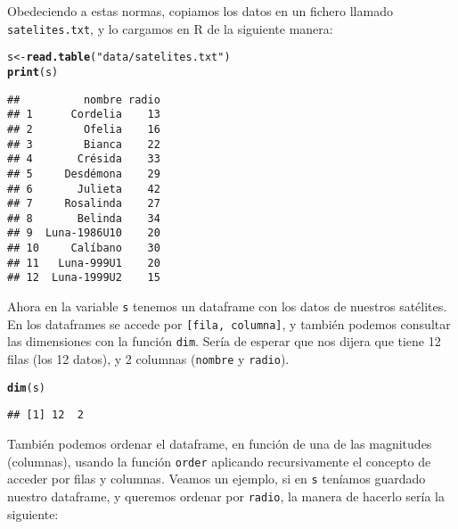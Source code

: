 \documentclass[12pt]{report}\usepackage[]{graphicx}\usepackage[dvipsnames]{xcolor}
\makeatletter
\newcommand{\hlstr}[1]{\textcolor[rgb]{0.192,0.494,0.8}{#1}}%
\newcommand{\hlstd}[1]{\textcolor[rgb]{0.345,0.345,0.345}{#1}}%
\newcommand{\hlkwb}[1]{\textcolor[rgb]{0.69,0.353,0.396}{#1}}%
\newcommand{\hlkwd}[1]{\textcolor[rgb]{0.737,0.353,0.396}{\textbf{#1}}}%
\newenvironment{kframe}{%
 \def\at@end@of@kframe{}%
 \ifinner\ifhmode%
  \def\at@end@of@kframe{\end{minipage}}%
  \begin{minipage}{\columnwidth}%
 \fi\fi%
 \def\FrameCommand##1{\hskip\@totalleftmargin \hskip-\fboxsep
 \colorbox{shadecolor}{##1}\hskip-\fboxsep
     \hskip-\linewidth \hskip-\@totalleftmargin \hskip\columnwidth}%
 \MakeFramed {\advance\hsize-\width
   \@totalleftmargin\z@ \linewidth\hsize
   \@setminipage}}%
 {\par\unskip\endMakeFramed%
 \at@end@of@kframe}
\newenvironment{knitrout}{}{} %
\makeatother
\begin{document}
			Obedeciendo a estas normas, copiamos los datos en un fichero llamado \texttt{satelites.txt}, y lo cargamos en R de la siguiente manera: 
			
\begin{knitrout}
\color{fgcolor}\begin{kframe}
\begin{alltt}
\hlstd{s} \hlkwb{<-} \hlkwd{read.table}\hlstd{(}\hlstr{"data/satelites.txt"}\hlstd{)}
\hlkwd{print}\hlstd{(s)}
\end{alltt}
\begin{verbatim}
##          nombre radio
## 1      Cordelia    13
## 2        Ofelia    16
## 3        Bianca    22
## 4       Crésida    33
## 5     Desdémona    29
## 6       Julieta    42
## 7     Rosalinda    27
## 8       Belinda    34
## 9  Luna-1986U10    20
## 10     Calíbano    30
## 11   Luna-999U1    20
## 12  Luna-1999U2    15
\end{verbatim}
\end{kframe}
\end{knitrout}
			
			Ahora en la variable \texttt{s} tenemos un dataframe con los datos de nuestros satélites. En los dataframes se accede por \texttt{[fila, columna]}, y también podemos consultar las dimensiones con la función \texttt{dim}. Sería de esperar que nos dijera que tiene 12 filas (los 12 datos), y 2 columnas (\texttt{nombre} y \texttt{radio}). 
			
\begin{knitrout}
\color{fgcolor}\begin{kframe}
\begin{alltt}
\hlkwd{dim}\hlstd{(s)}
\end{alltt}
\begin{verbatim}
## [1] 12  2
\end{verbatim}
\end{kframe}
\end{knitrout}
			
			También podemos ordenar el dataframe, en función de una de las magnitudes (columnas), usando la función \texttt{order} aplicando recursivamente el concepto de acceder por filas y columnas. Veamos un ejemplo, si en \texttt{s} teníamos guardado nuestro dataframe, y queremos ordenar por \texttt{radio}, la manera de hacerlo sería la siguiente: 
			
\end{document}
